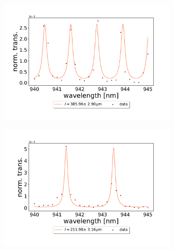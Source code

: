 \begin{figure}[h!]
    \centering
    \begin{subfigure}[b]{0.49\textwidth}
        \includegraphics[width=\textwidth]{figures/results/single fano fits/380um_off_res_fabry_perot.pdf}
        \caption{}
        \label{fig:380um_off_res_fabry_perot}
    \end{subfigure}
    \begin{subfigure}[b]{0.49\textwidth}
        \includegraphics[width=\textwidth]{figures/results/single fano fits/220um_off_res_fabry_perot.pdf}
        \caption{}
        \label{fig:220um_off_res_fabry_perot}
    \end{subfigure}
    \begin{subfigure}[b]{0.49\textwidth}

\end{subfigure}
\end{figure}
